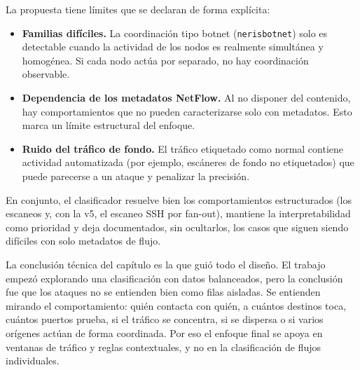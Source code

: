 La propuesta tiene límites que se declaran de forma explícita:

\begin{itemize}
  \item \textbf{Familias difíciles.} La coordinación tipo botnet (\texttt{nerisbotnet}) solo es detectable cuando la actividad de los nodos es realmente simultánea y homogénea. Si cada nodo actúa por separado, no hay coordinación observable.
  \item \textbf{Dependencia de los metadatos NetFlow.} Al no disponer del contenido, hay comportamientos que no pueden caracterizarse solo con metadatos. Esto marca un límite estructural del enfoque.
  \item \textbf{Ruido del tráfico de fondo.} El tráfico etiquetado como normal contiene actividad automatizada (por ejemplo, escáneres de fondo no etiquetados) que puede parecerse a un ataque y penalizar la precisión.
\end{itemize}

En conjunto, el clasificador resuelve bien los comportamientos estructurados (los escaneos y, con la v5, el escaneo SSH por fan-out), mantiene la interpretabilidad como prioridad y deja documentados, sin ocultarlos, los casos que siguen siendo difíciles con solo metadatos de flujo.

La conclusión técnica del capítulo es la que guió todo el diseño. El trabajo empezó explorando una clasificación con datos balanceados, pero la conclusión fue que los ataques no se entienden bien como filas aisladas. Se entienden mirando el comportamiento: quién contacta con quién, a cuántos destinos toca, cuántos puertos prueba, si el tráfico se concentra, si se dispersa o si varios orígenes actúan de forma coordinada. Por eso el enfoque final se apoya en ventanas de tráfico y reglas contextuales, y no en la clasificación de flujos individuales.

